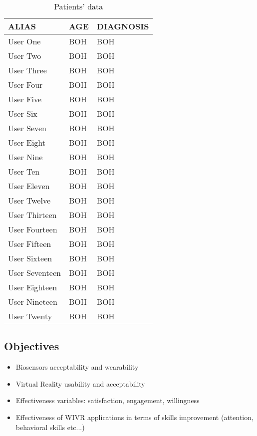 \begin{table}[H]
\centering
\tabulinesep=1.2mm
\begin{tabu} {|B|A|C|}
\hline
       \textbf{ALIAS} & \textbf{AGE} & \textbf{DIAGNOSIS}\\\hline
       User One & BOH & BOH\\\hline
       User Two & BOH & BOH\\\hline
     User Three & BOH & BOH\\\hline
     User Four & BOH & BOH\\\hline
     User Five & BOH & BOH\\\hline
     User Six & BOH & BOH\\\hline
     User Seven & BOH & BOH\\\hline
     User Eight & BOH & BOH\\\hline
     User Nine & BOH & BOH\\\hline
     User Ten & BOH & BOH\\\hline
     User Eleven & BOH & BOH\\\hline
     User Twelve & BOH & BOH\\\hline
     User Thirteen & BOH & BOH\\\hline
     User Fourteen & BOH & BOH\\\hline
     User Fifteen & BOH & BOH\\\hline
     User Sixteen & BOH & BOH\\\hline
     User Seventeen & BOH & BOH\\\hline
     User Eighteen & BOH & BOH\\\hline
     User Nineteen & BOH & BOH\\\hline
     User Twenty & BOH & BOH\\\hline     
 \end{tabu}
 \caption{Patients' data \label{table:datap}}
\end{table}
\subsection{Objectives}
\begin{itemize}
\item Biosensors acceptability and wearability
\item Virtual Reality usability and acceptability
\item Effectiveness variables: satisfaction, engagement, willingness
\item Effectiveness of WIVR applications in terms of skills improvement (attention, behavioral skills etc...)
\end{itemize}	
